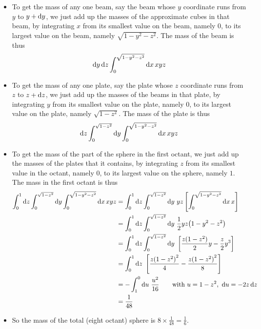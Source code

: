 \begin{eg}
\begin{itemize}
\item
To get the mass of any one beam, say the beam whose $y$ coordinate runs 
from $y$ to $y+\mathrm{d}y$, we just add up the masses of the approximate 
cubes in that beam, by integrating $x$ from its smallest value on 
the beam, namely $0$, to its largest value on the beam, namely 
$\sqrt{1-y^2-z^2}$. The mass of the beam is thus
\begin{align*}
\mathrm{d}y\,\mathrm{d}z \int_0^{\sqrt{1-y^2-z^2}}  \mathrm{d}x\,xyz
\end{align*}

\item
To get the mass of any one plate, say the plate whose $z$ coordinate runs 
from $z$ to $z+\mathrm{d}z$, we just add up the masses of the beams 
in that plate, by integrating $y$ from its smallest value on 
the plate, namely $0$, to its largest value on the plate, namely 
$\sqrt{1-z^2}$. The mass of the plate is thus
\begin{align*}
\mathrm{d}z\int_0^{\sqrt{1-z^2}}\mathrm{d}y\int_0^{\sqrt{1-y^2-z^2}}  \mathrm{d}x\,xyz
\end{align*}

\item
To get the mass of the part of the sphere in the first octant, we just 
add up the masses of the plates that it contains, by integrating $z$ from its smallest value in the octant, namely $0$, to its largest value on the sphere, 
namely  $1$. The mass in the first octant is thus
\begin{align*}
\int_0^1\dee{z}\int_0^{\sqrt{1-z^2}}\dee{y}\int_0^{\sqrt{1-y^2-z^2}}  \dee{x}\,xyz
&= \int_0^1\dee{z}\int_0^{\sqrt{1-z^2}}\dee{y}\ yz
          \left[\int_0^{\sqrt{1-y^2-z^2}}  \dee{x}\,x\right] \\
&= \int_0^1\dee{z}\int_0^{\sqrt{1-z^2}}\dee{y}\ 
              \frac{1}{2}yz \big(1-y^2-z^2\big) \\
&=\int_0^1\dee{z}\int_0^{\sqrt{1-z^2}}\dee{y}\ 
                      \left[\frac{z(1-z^2)}{2}y-\frac{z}{2}y^3\right] \\
&=\int_0^1\dee{z}\ \left[\frac{z{(1-z^2)}^2}{4}-\frac{z{(1-z^2)}^2}{8}\right] \\
&=-\int_1^0\dee{u}\ \frac{u^2}{16}
           \qquad\text{with }u=1-z^2,\ \dee{u}=-2z\,\dee{z} \\
&=\frac{1}{48}
\end{align*}
\item
So the mass of the total (eight octant) sphere is $8\times\frac{1}{48}=\frac{1}{6}$.
\end{itemize}

\end{eg}


